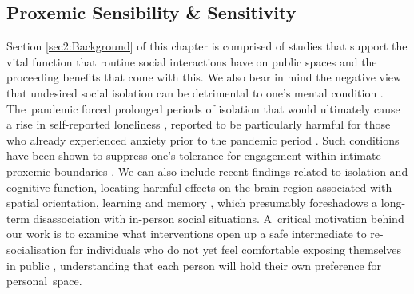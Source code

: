 \subsection*{Proxemic Sensibility \& Sensitivity}
\label{subsec:sensibility}
Section \ref{sec2:Background} of this chapter is comprised of studies that support the vital function that routine social interactions have on public spaces and the proceeding benefits that come with this. We also bear in mind the negative view that undesired social isolation can be detrimental to one's mental condition \citep{evans_social_2019,zorzo_adult_2019,mumtaz_neurobiology_2018}. The~pandemic forced prolonged periods of isolation that would ultimately cause a rise in self-reported loneliness \citep{forte_covid-19_2020}, reported to be particularly harmful for those who already experienced anxiety prior to the pandemic period \citep{liang_post-traumatic_2020,brooks_psychological_2020}. Such conditions have been shown to suppress one's tolerance for engagement within intimate proxemic boundaries \citep{layden_loneliness_2018}. We can also include recent findings related to isolation and cognitive function, locating harmful effects on the brain region associated with spatial orientation, learning and memory \citep{rivera_effects_2020,ritchie_cognitive_2020}, which presumably foreshadows a long-term disassociation with in-person social situations. A~critical motivation behind our work is to examine what interventions open up a safe intermediate to re-socialisation for individuals who do not yet feel comfortable exposing themselves in public \citep{lupton_coping_2022}, understanding that each person will hold their own preference for personal~space.

